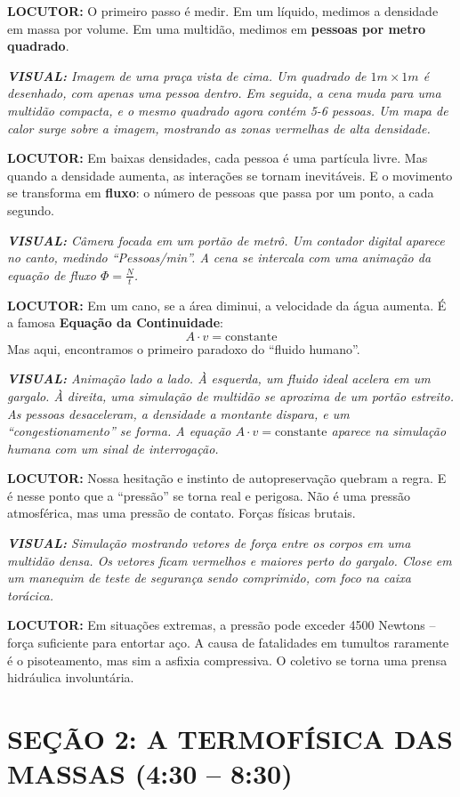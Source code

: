 \documentclass[a4paper, 10pt]{article}
\newcommand{\locutor}[1]{%
	\par\noindent\textcolor{locutorgray}{\textbf{LOCUTOR:} #1}%
}
\newcommand{\visual}[1]{%
	\par\noindent\textcolor{visualblue}{\textit{\textbf{VISUAL:} #1}}%
}
\begin{document}
	\locutor{O primeiro passo é medir. Em um líquido, medimos a densidade em massa por volume. Em uma multidão, medimos em \textbf{pessoas por metro quadrado}.}
	
	\visual{Imagem de uma praça vista de cima. Um quadrado de $1m \times 1m$ é desenhado, com apenas uma pessoa dentro. Em seguida, a cena muda para uma multidão compacta, e o mesmo quadrado agora contém 5-6 pessoas. Um mapa de calor surge sobre a imagem, mostrando as zonas vermelhas de alta densidade.}
	
	\locutor{Em baixas densidades, cada pessoa é uma partícula livre. Mas quando a densidade aumenta, as interações se tornam inevitáveis. E o movimento se transforma em \textbf{fluxo}: o número de pessoas que passa por um ponto, a cada segundo.}
	
	\visual{Câmera focada em um portão de metrô. Um contador digital aparece no canto, medindo ``Pessoas/min''. A cena se intercala com uma animação da equação de fluxo $\Phi = \frac{N}{t}$.}
	
	\locutor{Em um cano, se a área diminui, a velocidade da água aumenta. É a famosa \textbf{Equação da Continuidade}: $$ A \cdot v = \text{constante} $$ Mas aqui, encontramos o primeiro paradoxo do ``fluido humano''.}
	
	\visual{Animação lado a lado. À esquerda, um fluido ideal acelera em um gargalo. À direita, uma simulação de multidão se aproxima de um portão estreito. As pessoas \textit{desaceleram}, a densidade a montante dispara, e um ``congestionamento'' se forma. A equação $A \cdot v = \text{constante}$ aparece na simulação humana com um sinal de interrogação.}
	
	\locutor{Nossa hesitação e instinto de autopreservação quebram a regra. E é nesse ponto que a ``pressão'' se torna real e perigosa. Não é uma pressão atmosférica, mas uma pressão de contato. Forças físicas brutais.}
	
	\visual{Simulação mostrando vetores de força entre os corpos em uma multidão densa. Os vetores ficam vermelhos e maiores perto do gargalo. Close em um manequim de teste de segurança sendo comprimido, com foco na caixa torácica.}
	
	\locutor{Em situações extremas, a pressão pode exceder 4500 Newtons – força suficiente para entortar aço. A causa de fatalidades em tumultos raramente é o pisoteamento, mas sim a asfixia compressiva. O coletivo se torna uma prensa hidráulica involuntária.}
	
	\section*{SEÇÃO 2: A TERMOFÍSICA DAS MASSAS (4:30 -- 8:30)}
	
\end{document}
